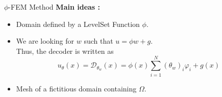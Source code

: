 \begin{frame}{$\phi$-FEM Method}
	\textbf{Main ideas :} \hspace{30pt}   \small
	
	\begin{minipage}[t]{0.48\linewidth}
		\begin{itemize}[\textbullet]
			\item Domain defined by a LevelSet Function $\phi$.
		\end{itemize}
		\centering
	\end{minipage} \hfill
	\begin{minipage}[t]{0.48\linewidth}
		\begin{itemize}[\textbullet]
			\item We are looking for $w$ such that $u=\phi w+g$. \\
			Thus, the decoder is written as
			\begin{equation*}
				u_\theta(x)=\mathcal{D}_{\theta_w}(x) = \phi(x)\sum_{i=1}^{N}(\theta_w)_i\varphi_i+g(x)
			\end{equation*}
		\end{itemize}
	\end{minipage}

	\begin{itemize}[\textbullet]
		\item Mesh of a fictitious domain containing $\Omega$.
	\end{itemize}
	\begin{center}
		\begin{minipage}{0.43\linewidth}
			\centering
		\end{minipage} \hfill
		\begin{minipage}{0.1\linewidth}
			\centering
		\end{minipage} \hfill
		\begin{minipage}{0.43\linewidth}
			\centering
		\end{minipage}
	\end{center}
\end{frame}

